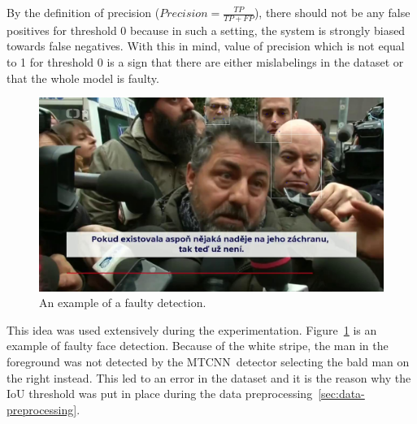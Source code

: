 By the definition of precision ($Precision = \frac{TP}{TP+FP}$), there should not be any false positives
for threshold 0 because in such a setting, the system is strongly biased towards false negatives.
With this in mind, value of precision which is not equal to 1 for threshold 0 is a sign that there are either
mislabelings in the dataset or that the whole model is faulty.

\begin{figure}[H]
    \centering
    \includegraphics[width=0.9\columnwidth]{images/implementation/faulty_detection.jpg}
    \caption{An example of a faulty detection.}
    \label{fig:faulty_bbox}
\end{figure}

This idea was used extensively during the experimentation.
Figure~\ref{fig:faulty_bbox} is an example of faulty face detection.
Because of the white stripe, the man in the foreground was not detected by the MTCNN detector selecting the bald man
on the right instead.
This led to an error in the dataset and it is the reason why the IoU threshold was put in place during the data
preprocessing~\ref{sec:data-preprocessing}.